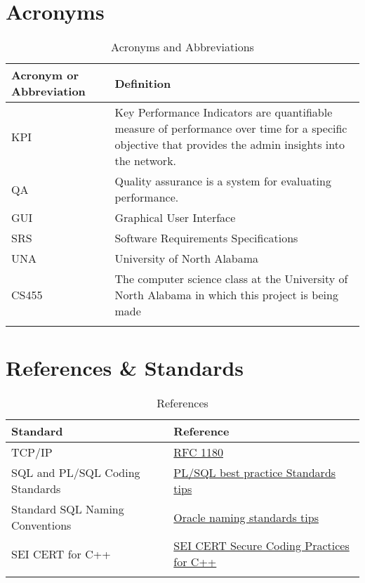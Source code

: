 \documentclass[letterpaper,12pt,oneside,listof=totoc]{scrreprt}
\begin{document}
\section{Acronyms} %
\begin{longtable}{| p{} | p{} |} 
    \hline
   \textbf{ Acronym or Abbreviation} & \textbf{Definition}\\
    \hline
    KPI & Key Performance Indicators are quantifiable measure of performance over time for a specific objective that provides the admin insights into the network. \\
    \hline
    QA & Quality assurance is a system for evaluating performance. \\
    \hline
    GUI & Graphical User Interface\\
    \hline
    SRS & Software Requirements Specifications\\
    \hline
    UNA & University of North Alabama\\
    \hline
    CS455 & The computer science class at the University of North Alabama in which this project is being made\\
    \hline
\caption{Acronyms and Abbreviations}
\end{longtable}

\section{References \& Standards} 
\begin{longtable}{ p{} p{} } 
   \textbf{ Standard} & \textbf{Reference }\\
    \hline
    TCP/IP &  \href{https://datatracker.ietf.org/doc/html/rfc1180}{RFC 1180}\\
    
    SQL and PL/SQL Coding Standards  & \href{http://www.dba-oracle.com/t_plsql_best_practices_standards.htm}{PL/SQL best practice Standards tips}\\
    
    Standard SQL Naming Conventions & \href{http://www.dba-oracle.com/standards_schema_object_names.htm}{Oracle naming standards tips}\\
    
    SEI CERT for C++ & \href{https://wiki.sei.cmu.edu/confluence/pages/viewpage.action?pageId=88046682}{SEI CERT Secure Coding Practices for C++}\\
\caption{References}
\end{longtable}
\end{document}
